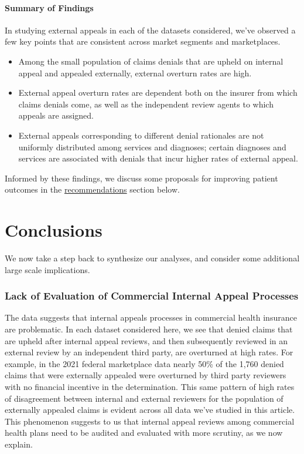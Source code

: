\documentclass[12pt, a4paper,twoside,parskip=full]{report}
\theoremstyle{plain} %
\theoremstyle{definition} %
\theoremstyle{remark} %
\numberwithin{equation}{chapter}
\begin{document}
		\subsubsection{Summary of Findings}
		
		In studying external appeals in each of the datasets considered, we've observed a few key points
		that are consistent across market segments and marketplaces.
		
		\begin{itemize}
			\item Among the small population of claims denials that are upheld on internal appeal and appealed externally, 
			external overturn rates are high.
			\item External appeal overturn rates are dependent both on the insurer from which claims denials come,
			as well as the independent review agents to which appeals are assigned.
			\item External appeals corresponding to different denial rationales are not uniformly distributed among
			services and diagnoses; certain diagnoses and services are associated with denials that
			incur higher rates of external appeal.
		\end{itemize}
		
		Informed by these findings, we discuss some proposals for improving patient outcomes 
		in the \hyperref[recommendations]{recommendations} section below.
		
		
		\chapter{Conclusions}\label{conclusions}
		
		We now take a step back to synthesize our analyses, and consider some additional large scale implications.
		
		\subsection{Lack of Evaluation of Commercial Internal Appeal Processes}
		
		The data suggests that internal appeals processes in commercial health insurance are problematic.
		In each dataset considered here, we see that denied claims that are upheld after internal appeal reviews, 
		and then subsequently reviewed in an external review by an independent third party, are overturned at high rates.
		For example, in the 2021 federal marketplace data nearly 50\% of the 1,760 denied claims that were externally appealed 
		were overturned by third party reviewers with no financial incentive in the determination. This same pattern of high 
		rates of disagreement between internal and external reviewers for the population of externally appealed claims is evident 
		across all data we've studied in this article. This phenomenon suggests to us that internal appeal reviews among commercial health
		plans need to be audited and evaluated with more scrutiny, as we now explain.
		
\end{document}
